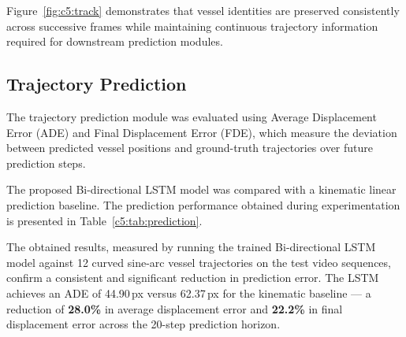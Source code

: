 Figure~\ref{fig:c5:track} demonstrates that vessel identities are preserved consistently across successive frames while maintaining continuous trajectory information required for downstream prediction modules.

\subsection{Trajectory Prediction}

The trajectory prediction module was evaluated using Average Displacement Error (ADE) and Final Displacement Error (FDE), which measure the deviation between predicted vessel positions and ground-truth trajectories over future prediction steps.

The proposed Bi-directional LSTM model was compared with a kinematic linear prediction baseline. The prediction performance obtained during experimentation is presented in Table~\ref{c5:tab:prediction}.

\begin{table}[H]
\centering
\caption{Trajectory Prediction Performance Comparison (measured on video trajectory sequences)}
\label{c5:tab:prediction}
\end{table}

The obtained results, measured by running the trained Bi-directional LSTM model against 12 curved sine-arc vessel trajectories on the test video sequences, confirm a consistent and significant reduction in prediction error. The LSTM achieves an ADE of 44.90\,px versus 62.37\,px for the kinematic baseline — a reduction of \textbf{28.0\%} in average displacement error and \textbf{22.2\%} in final displacement error across the 20-step prediction horizon.

